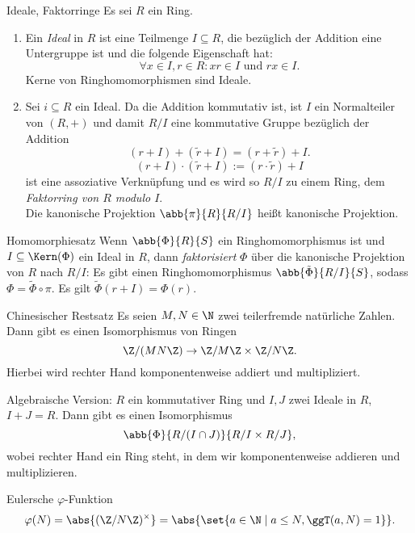\begin{karte}{Ideale, Faktorringe}
    Es sei \(R\) ein Ring. 
    \begin{enumerate}
        \item Ein \textit{Ideal} in \(R\) ist eine Teilmenge 
        \(I\subseteq R\), die bezüglich der Addition eine 
        Untergruppe ist und die folgende Eigenschaft hat:
        \[ \forall x \in I, r\in R: xr \in I \text{ und } rx \in I. \]
        Kerne von Ringhomomorphismen sind Ideale.
        \item Sei \(i \subseteq R\) ein Ideal. Da die Addition 
        kommutativ ist, ist \(I\) ein Normalteiler von \((R,+)\) 
        und damit \(R/I\) eine kommutative Gruppe bezüglich der Addition 
        \[ (r+I) + (\tilde{r} + I) = (r + \tilde{r}) + I. \]
        \[ (r + I) \cdot (\tilde{r} + I) := (r \cdot \tilde{r}) + I \]
        ist eine assoziative Verknüpfung und es wird so 
        \(R/I\) zu einem Ring, dem \textit{Faktorring von \(R\) modulo \(I\)}.\\
        Die kanonische Projektion \(\abb{\pi}{R}{R/I}\) heißt kanonische Projektion.
    \end{enumerate}
\end{karte}

\begin{karte}{Homomorphiesatz}
    Wenn \(\abb{\Phi}{R}{S}\) ein Ringhomomorphismus ist und 
    \(I \subseteq \Kern(\Phi)\) ein Ideal in \(R\), dann 
    \textit{faktorisiert} \(\Phi\) über die kanonische Projektion 
    von \(R\) nach \(R/I\): Es gibt einen Ringhomomorphismus 
    \( \abb{\tilde{\Phi}}{R/I}{S} \), sodass \( \Phi = \tilde{\Phi} \circ \pi \).
    Es gilt \(\tilde{\Phi}(r+I) = \Phi(r)\).
\end{karte}

\begin{karte}{Chinesischer Restsatz}
    Es seien \(M,N\in \N\) zwei teilerfremde natürliche Zahlen. 
    Dann gibt es einen Isomorphismus von Ringen 
    \[ \Z/(MN \Z) \rightarrow \Z / M\Z \times \Z/N\Z. \]
    Hierbei wird rechter Hand komponentenweise addiert und multipliziert.

    Algebraische Version: \(R\) ein kommutativer Ring und \(I,J\) 
    zwei Ideale in \(R\), \(I + J = R\). Dann gibt es einen 
    Isomorphismus 
    \[ \abb{\Phi}{R/(I\cap J)}{R/I \times R/J}, \]
    wobei rechter Hand ein Ring steht, in dem wir komponentenweise addieren 
    und multiplizieren.
\end{karte}

\begin{karte}{Eulersche \(\varphi\)-Funktion}
    \[ \varphi(N) = \abs{(\Z/N\Z)^\times} = \abs{\set{a\in \N \;|\; a\leq N, \ggT(a,N) = 1}}. \]
\end{karte}

